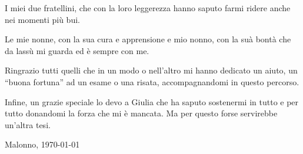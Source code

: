 \documentclass[12pt,a4paper,openright]{book} %
\begin{document}
I miei due fratellini, che con la loro leggerezza hanno saputo farmi
ridere anche nei momenti più bui.

Le mie nonne, con la sua cura e apprensione e mio nonno, con la suà
bontà che da lassù mi guarda ed è sempre con me.

\bigskip

Ringrazio tutti quelli che in un modo o nell'altro mi hanno dedicato
un aiuto, un ``buona fortuna'' ad un esame o una risata,
accompagnandomi in questo percorso.

\bigskip

Infine, un grazie speciale lo devo a Giulia che ha saputo sostenermi
in tutto e per tutto donandomi la forza che mi è mancata. Ma per
questo forse servirebbe un'altra tesi.

\bigskip
\bigskip

\begin{flushright}
	Malonno, \today
\end{flushright}



\printbibliography
{}
\end{document}
